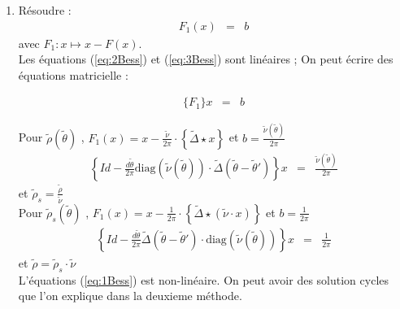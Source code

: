 \begin{enumerate}[label = Méthode \arabic*)]
	\item Résoudre :
		\begin{eqnarray}
			F_1 ( x  ) & = & b 	
		\end{eqnarray}
		avec $F_1 \colon x \mapsto x - F(x)$.\\

 

		
		
		Les équations (\ref{eq:2Bess}) et (\ref{eq:3Bess}) sont linéaires ; On peut écrire des équations matricielle :
		
		\begin{eqnarray}
			\{F_1\}  x   & = & b  	
		\end{eqnarray} 
		
		Pour $\tilde{\rho} ( \tilde{\theta} ) $ , $F_1 ( x )= x -  \frac{\tilde{\nu}}{2 \pi} \cdot \left \{\tilde{\Delta} \star x \right  \}  $ et $ b = \frac{\tilde{\nu}(\tilde{\theta}) }{2 \pi}$
		\begin{eqnarray}
			\left \{ Id - \frac{d \tilde{\theta}}{2 \pi} \mbox{diag} ( \tilde{\nu}   ( \tilde{\theta} )) \cdot \tilde{\Delta} ( \tilde{\theta} - \tilde{\theta }' ) \right \} x  &= & \frac{\tilde{\nu}(\tilde{\theta}) }{2 \pi}	
		\end{eqnarray}
		et $ \tilde{ \rho}_s = \frac{\tilde{\rho}}{\tilde{\nu}}$\\
		
		Pour $\tilde{\rho}_s ( \tilde{\theta} ) $ , $F_1 ( x )= x -  \frac{1}{2 \pi} \cdot \left \{\tilde{\Delta} \star (\tilde{\nu} \cdot x )  \right  \}  $ et $ b = \frac{1 }{2 \pi}$
		\begin{eqnarray}
			\left \{ Id - \frac{d \tilde{\theta}}{2 \pi}   \tilde{\Delta} ( \tilde{\theta} - \tilde{\theta }' )  \cdot \mbox{diag} ( \tilde{\nu}   ( \tilde{\theta} )) \right \} x  & = &  \frac{1 }{2 \pi}	
		\end{eqnarray}
		et $\tilde{ \rho} = \tilde{\rho}_s \cdot \tilde{\nu}$\\
		

		
		
		L'équations (\ref{eq:1Bess}) est non-linéaire. On peut avoir des solution cycles que l'on explique dans la deuxieme méthode.


\end{enumerate}
